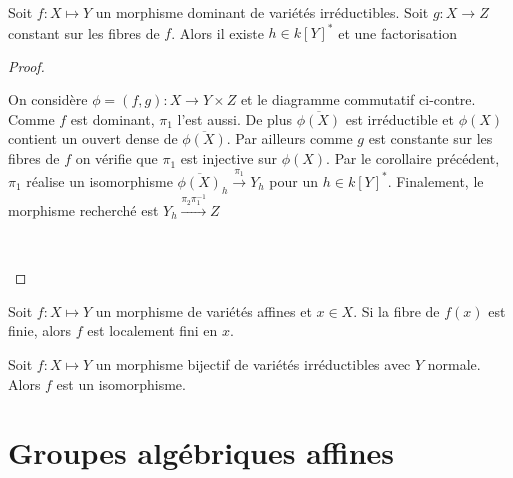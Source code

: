 \begin{prop}\label{facto}
Soit $f:X \mapsto Y$ un morphisme dominant de variétés irréductibles. Soit $g:X \rightarrow Z$ constant sur les fibres de $f$. Alors il existe $h\in k[Y]^*$ et une factorisation
\end{prop}
\begin{proof}
	\begin{multicols}{2}
	On considère $\phi=(f,g):X\rightarrow Y\times Z$ et le diagramme commutatif ci-contre. Comme $f$ est dominant, $\pi_1$ l'est aussi. De plus $\overline{\phi(X)}$ est irréductible et $\phi(X)$ contient un ouvert dense de $\overline{\phi(X)}$. Par ailleurs comme $g$ est constante sur les fibres de $f$ on vérifie que $\pi_1$ est injective sur $\phi(X)$. Par le corollaire précédent, $\pi_1$ réalise un isomorphisme $\overline{\phi(X)}_h \xrightarrow{\pi_1} Y_h$ pour un $h\in k[Y]^*$. Finalement, le morphisme recherché est  $Y_h \xrightarrow{\pi_2\pi_1^{-1}} Z$ 
	
	\columnbreak
	\begin{center}
	\\
	\end{center}
	\end{multicols}
\end{proof}

\begin{prop}
Soit $f:X \mapsto Y$ un morphisme de variétés affines et $x\in X$. Si la fibre de $f(x)$ est finie, alors $f$ est localement fini en $x$.
\end{prop}

\begin{thm}
Soit $f:X \mapsto Y$ un morphisme bijectif de variétés irréductibles avec $Y$ normale. Alors $f$ est un isomorphisme.
\end{thm}



\section{Groupes algébriques affines}
